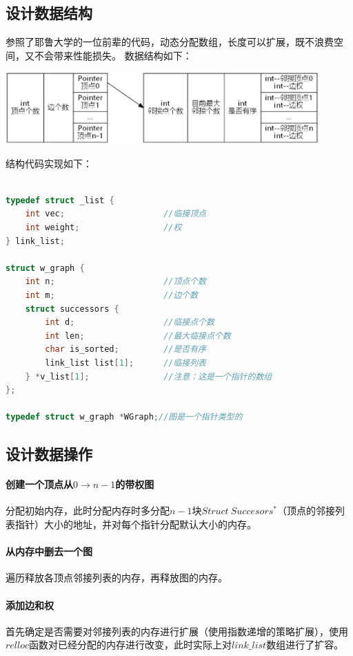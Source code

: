 \documentclass[a4paper,10pt]{ctexart}
\begin{document}
\subsection{设计数据结构}
参照了耶鲁大学的一位前辈的代码，动态分配数组，长度可以扩展，既不浪费空间，又不会带来性能损失。
数据结构如下：

\includegraphics[width=0.9\textwidth]{../Pics/DataStruct.eps}

结构代码实现如下：
\begin{lstlisting}[language={C}]

typedef struct _list {
    int vec;                    //临接顶点
    int weight;                 //权
} link_list;

struct w_graph {
    int n;                      //顶点个数
    int m;                      //边个数
    struct successors {
        int d;                  //临接点个数
        int len;                //最大临接点个数
        char is_sorted;         //是否有序
        link_list list[1];      //临接列表
    } *v_list[1];               //注意：这是一个指针的数组
};

typedef struct w_graph *WGraph;//图是一个指针类型的
\end{lstlisting}
\subsection{设计数据操作}
\paragraph{创建一个顶点从$0 \to n-1$的带权图}分配初始内存，此时分配内存时多分配$n-1$块$Struct\ Succesors^*$（顶点的邻接列表指针）大小的地址，并对每个指针分配默认大小的内存。
\paragraph{从内存中删去一个图}遍历释放各顶点邻接列表的内存，再释放图的内存。
\paragraph{添加边和权}首先确定是否需要对邻接列表的内存进行扩展（使用指数递增的策略扩展），使用$relloc$函数对已经分配的内存进行改变，此时实际上对$link\_list$数组进行了扩容。
\end{document}
